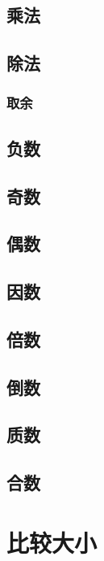 \subsection{乘法}

\subsection{除法}

\subsubsection{取余}

\subsection{负数}

\subsection{奇数}

\subsection{偶数}

\subsection{因数}

\subsection{倍数}

\subsection{倒数}

\subsection{质数}

\subsection{合数}

\section{比较大小}

